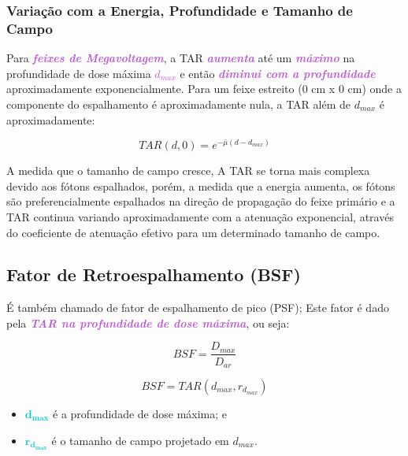 \documentclass[11pt,a4paper]{article}
\newcounter{exemplo}
\begin{document}
	\subsubsection*{Variação com a Energia, Profundidade e Tamanho de Campo}

	Para \textcolor{MediumOrchid}{\textbf{\textit{feixes de Megavoltagem}}}, a TAR \textcolor{MediumOrchid}{\textbf{\textit{aumenta}}} até um \textcolor{MediumOrchid}{\textbf{\textit{máximo}}} na profundidade de dose máxima \textcolor{MediumOrchid}{\textbf{\textit{$d_{max}$}}} e então \textcolor{MediumOrchid}{\textbf{\textit{diminui com a profundidade}}} aproximadamente exponencialmente. Para um feixe estreito (0 cm x 0 cm) onde a componente do espalhamento é aproximadamente nula, a TAR além de $d_{max}$ é aproximadamente:
	
		\begin{equation}
			TAR(d, 0) = e^{-\bar{\mu} (d - d_{max})}
		\end{equation}

	A medida que o tamanho de campo cresce, A TAR se torna mais complexa devido aos fótons espalhados, porém, a medida que a energia aumenta, os fótons são preferencialmente espalhados na direção de propagação do feixe primário e a TAR continua variando aproximadamente com a atenuação exponencial, através do coeficiente de atenuação efetivo para um determinado tamanho de campo.

	\subsection*{Fator de Retroespalhamento (BSF)}

	É também chamado de fator de espalhamento de pico (PSF); Este fator é dado pela \textcolor{MediumOrchid}{\textbf{\textit{TAR na profundidade de dose máxima}}}, ou seja:

		\begin{equation}
			BSF = \frac{D_{max}}{D_{ar}}
		\end{equation}

		\begin{equation}
			BSF = TAR(d_{max}, r_{d_{max}})
		\end{equation}

	\begin{exemplo}[onde:]
		\begin{itemize}
			\item \textcolor{DarkTurquoise}{$\mathbf{d_{max}}$} é a profundidade de dose máxima; e
			\item \textcolor{DarkTurquoise}{$\mathbf{r_{d_{max}}}$} é o tamanho de campo projetado em $d_{max}$.
		\end{itemize}
	\end{exemplo}
	
\end{document}
